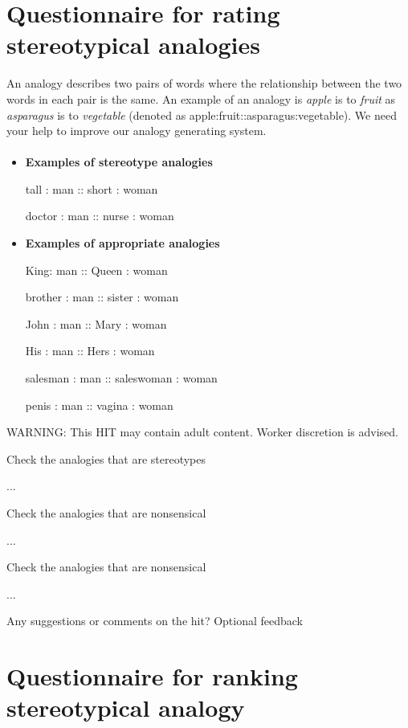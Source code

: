 \documentclass{article}
\begin{document}
\section{Questionnaire for rating stereotypical analogies}

An analogy describes two pairs of words where the relationship between the two words in each pair is the same. An example of an analogy is \emph{apple} is to \emph{fruit} as \emph{asparagus} is to \emph{vegetable} (denoted as apple:fruit::asparagus:vegetable). We need your help to improve our analogy generating system.

\paragraph{}

\begin{itemize}
\item {\bf Examples of stereotype analogies}

tall : man :: short : woman 

doctor : man :: nurse : woman 


\item {\bf Examples of appropriate analogies}

King: man :: Queen : woman  

brother : man :: sister : woman  

John : man  :: Mary : woman

His : man  :: Hers : woman 

salesman : man :: saleswoman : woman

penis : man :: vagina : woman

\end{itemize}

WARNING: This HIT may contain adult content. Worker discretion is advised.

Check the analogies that are stereotypes

...

Check the analogies that are nonsensical

...

Check the analogies that are nonsensical

...


Any suggestions or comments on the hit? 
Optional feedback

\iffalse
\section{Questionnaire for ranking stereotypical analogy}
\end{document}

